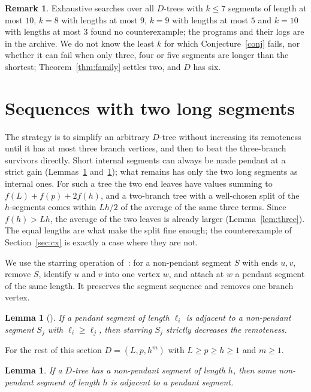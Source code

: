 \documentclass[11pt]{amsart}
\newtheorem{lemma}[thm]{Lemma}
\theoremstyle{definition}
\newtheorem{remark}[thm]{Remark}
\begin{document}
\begin{remark}\label{rem:open}
Exhaustive searches over all $D$-trees with $k\le7$ segments of length at most $10$, $k=8$ with lengths at most $9$,
$k=9$ with lengths at most $5$ and $k=10$ with lengths at most $3$ found no counterexample; the programs and their logs are in the archive. We do not know the least $k$ for which
Conjecture~\ref{conj} fails, nor whether it can fail when only three, four or five segments are longer than the
shortest; Theorem~\ref{thm:family} settles two, and $D$ has six.
\end{remark}

\section{Sequences with two long segments}\label{sec:family}

The strategy is to simplify an arbitrary $D$-tree without increasing its remoteness until it has at most three
branch vertices, and then to beat the three-branch survivors directly. Short internal segments can always be made
pendant at a strict gain (Lemmas~\ref{lem:star} and~\ref{lem:prune}); what remains has only the two long segments as
internal ones. For such a tree the two end leaves have values summing to $f(L)+f(p)+2f(h)$, and a two-branch tree
with a well-chosen split of the $h$-segments comes within $Lh/2$ of the average of the same three terms. Since
$f(h)>Lh$, the average of the two leaves is already larger (Lemma~\ref{lem:three}). The equal lengths are what make
the split fine enough; the counterexample of Section~\ref{sec:cx} is exactly a case where they are not.

We use the starring operation of~\cite[Definition~2.8]{ADHM}: for a non-pendant segment $S$ with ends $u,v$, remove
$S$, identify $u$ and $v$ into one vertex $w$, and attach at $w$ a pendant segment of the same length. It preserves
the segment sequence and removes one branch vertex.

\begin{lemma}[{\cite[Lemma~4.1]{ADHM}}]\label{lem:star}
If a pendant segment of length $\ell_i$ is adjacent to a non-pendant segment $S_j$ with $\ell_i\ge\ell_j$, then
starring $S_j$ strictly decreases the remoteness.
\end{lemma}

For the rest of this section $D=(L,p,h^m)$ with $L\ge p\ge h\ge1$ and $m\ge1$.

\begin{lemma}\label{lem:prune}
If a $D$-tree has a non-pendant segment of length $h$, then some non-pendant segment of length $h$ is adjacent to a
pendant segment.
\end{lemma}
\end{document}
